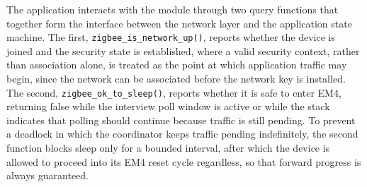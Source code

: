 The application interacts with the module through two query functions that together form the interface between the network layer and the application state machine.
The first, \texttt{zigbee\_is\_network\_up()}, reports whether the device is joined and the security state is established, where a valid security context, rather than association alone, is treated as the point at which application traffic may begin, since the network can be associated before the network key is installed.
The second, \texttt{zigbee\_ok\_to\_sleep()}, reports whether it is safe to enter EM4, returning false while the interview poll window is active or while the stack indicates that polling should continue because traffic is still pending.
To prevent a deadlock in which the coordinator keeps traffic pending indefinitely, the second function blocks sleep only for a bounded interval, after which the device is allowed to proceed into its EM4 reset cycle regardless, so that forward progress is always guaranteed.
